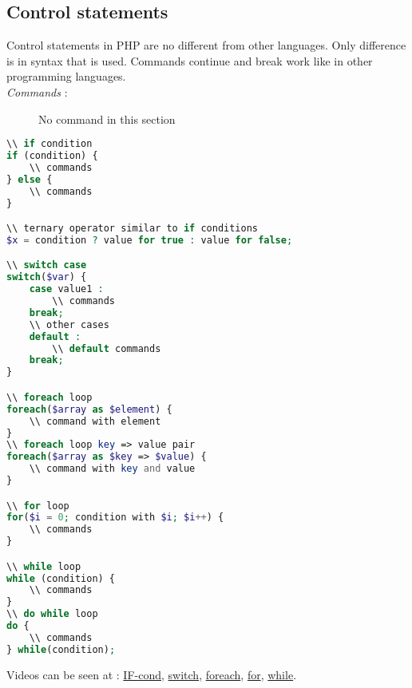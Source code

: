 \documentclass{article}
\begin{document}
\subsection{Control statements}
Control statements in PHP are no different from other languages. Only difference is in syntax that is used. Commands continue and break work like in other programming languages. \\
\textit{Commands} : 
\begin{description}
\item[\hspace{1cm}] No command in this section
\end{description}
\begin{lstlisting}[language=PHP]
\\ if condition
if (condition) {
	\\ commands
} else {
	\\ commands
}

\\ ternary operator similar to if conditions
$x = condition ? value for true : value for false;

\\ switch case
switch($var) {
	case value1 :
		\\ commands
	break;
	\\ other cases
	default :
		\\ default commands
	break;
}

\\ foreach loop
foreach($array as $element) {
	\\ command with element
}
\\ foreach loop key => value pair
foreach($array as $key => $value) {
	\\ command with key and value
}

\\ for loop
for($i = 0; condition with $i; $i++) {
	\\ commands
}

\\ while loop
while (condition) {
	\\ commands
}
\\ do while loop
do {
	\\ commands
} while(condition);

\end{lstlisting}
Videos can be seen at : \href{http://youtu.be/sQRCnNbEWm4}{IF-cond}, \href{http://youtu.be/q82QMgFvGAE}{switch}, \href{http://youtu.be/SG728V5lD0g}{foreach}, \href{http://youtu.be/FkXws1wTaEo}{for}, \href{http://youtu.be/gn5Rmn2gLJo}{while}.
\end{document}

